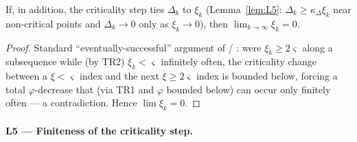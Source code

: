 \begin{lemma}
  \label{lem:tr-lim}
  If, in addition, the criticality step ties $\Delta_k$ to $\xi_k$
  (Lemma~\ref{lem:L5}: $\Delta_k\ge\kappa_\Delta\xi_k$ near non-critical points and
  $\Delta_k\to0$ only as $\xi_k\to0$), then $\lim_{k\to\infty}\xi_k=0$.
\end{lemma}
\begin{proof}
  Standard ``eventually-successful'' argument of \citet[Thm~6.4.6]{ConnGouldToint2000}
  / \citet[Ch.~10]{CSV2009}: were $\xi_k\ge2\varsigma$ along a subsequence while
  (by TR2) $\xi_k<\varsigma$ infinitely often, the criticality change between a
  $\xi<\varsigma$ index and the next $\xi\ge2\varsigma$ index is bounded below, forcing
  a total $\varphi$-decrease that (via TR1 and $\varphi$ bounded below) can occur only
  finitely often --- a contradiction. Hence $\lim\xi_k=0$.
\end{proof}

\paragraph{L5 --- Finiteness of the criticality step.}

